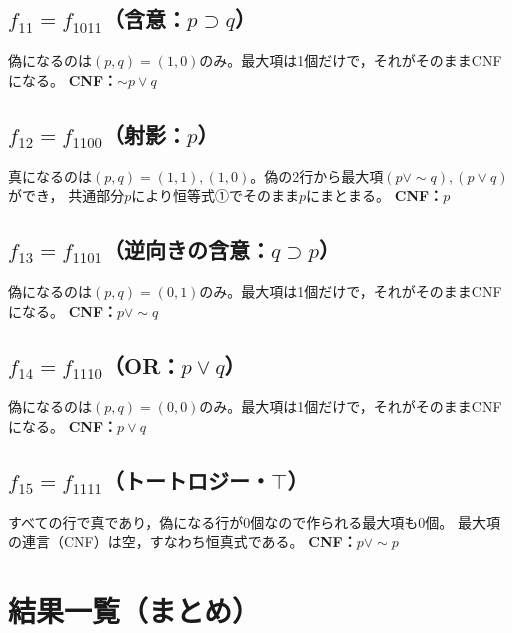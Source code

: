 \documentclass[autodetect-engine,dvi=dvipdfmx,ja=standard]{bxjsarticle}
\begin{document}
\subsection*{\(f_{11}=f_{1011}\)（含意：\(p\supset q\)）}
偽になるのは\((p,q)=(1,0)\)のみ。最大項は1個だけで，それがそのままCNFになる。
\textbf{CNF：}\(\sim p\lor q\)

\subsection*{\(f_{12}=f_{1100}\)（射影：\(p\)）}
真になるのは\((p,q)=(1,1),(1,0)\)。偽の2行から最大項\((p\lor\sim q),(p\lor q)\)ができ，
共通部分\(p\)により恒等式①でそのまま\(p\)にまとまる。
\textbf{CNF：}\(p\)

\subsection*{\(f_{13}=f_{1101}\)（逆向きの含意：\(q\supset p\)）}
偽になるのは\((p,q)=(0,1)\)のみ。最大項は1個だけで，それがそのままCNFになる。
\textbf{CNF：}\(p\lor\sim q\)

\subsection*{\(f_{14}=f_{1110}\)（OR：\(p\lor q\)）}
偽になるのは\((p,q)=(0,0)\)のみ。最大項は1個だけで，それがそのままCNFになる。
\textbf{CNF：}\(p\lor q\)

\subsection*{\(f_{15}=f_{1111}\)（トートロジー・\(\top\)）}
すべての行で真であり，偽になる行が0個なので作られる最大項も0個。
最大項の連言（CNF）は空，すなわち恒真式である。
\textbf{CNF：}\(p\lor\sim p\)

\section{結果一覧（まとめ）}
\end{document}

